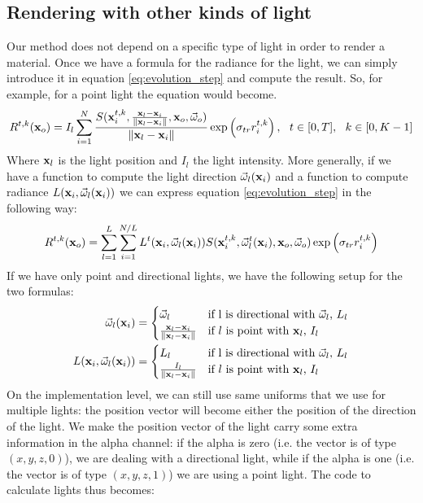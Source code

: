 \subsection{Rendering with other kinds of light}
Our method does not depend on a specific type of light in order to render a material. Once we have a formula for the radiance for the light, we can simply introduce it in equation \ref{eq:evolution_step} and compute the result. So, for example, for a point light the equation would become.
$$
R^{t,k}(\x_o) = {I_l} \sum_{i = 1}^N  \frac{S(\x^{t,k}_i, \frac{\x_l - \x_i}{\|\x_l - \x_i\|}, \x_o, \vomega_o)}{{\|\x_l - \x_i\|}} \exp\left(\sigma_{tr} r^{t,k}_i\right), \ \ t \in [0,T], \ \ k \in [0,K-1] 
\label{eq:evolution_step_2}
$$
Where $\mathbf{x}_l$ is the light position and $I_l$ the light intensity. More generally, if we have a function to compute the light direction $\vec{\omega}_l(\mathbf{x}_i)$ and a function to compute radiance $L(\mathbf{x}_i, \vec{\omega}_l(\mathbf{x}_i))$ we can express equation \ref{eq:evolution_step} in the following way:
$$
R^{t,k}(\mathbf{x}_o) = \sum_{l = 1}^L \sum_{i = 1}^{N/L} L^t(\mathbf{x}_i, \vec{\omega}_l(\mathbf{x}_i)) S(\mathbf{x}^{t,k}_i, \vec{\omega}_l^t(\mathbf{x}_i), \mathbf{x}_o, \vec{\omega}_o) \exp\left(\sigma_{tr} r^{t,k}_i\right)
$$
If we have only point and directional lights, we have the following setup for the two formulas:
\begin{equation*}
\begin{split}
\vec{\omega}_l(\mathbf{x}_i) &= \begin{cases}
\vec{\omega}_l & \text{if l is directional with $\vec{\omega}_l$, $L_l$} \\
 \frac{\mathbf{x}_l - \mathbf{x}_i}{\|\mathbf{x}_l - \mathbf{x}_i\|} & \text{if $l$ is point with $\mathbf{x}_l$, $I_l$}
\end{cases} \\
L(\mathbf{x}_i, \vec{\omega}_l(\mathbf{x}_i)) &= \begin{cases}
L_l & \text{if l is directional with $\vec{\omega}_l$, $L_l$} \\
 \frac{I_l}{\|\mathbf{x}_l - \mathbf{x}_i\|} & \text{if $l$ is point with $\mathbf{x}_l$, $I_l$}
\end{cases} \\
\end{split}
\end{equation*}
On the implementation level, we can still use same uniforms that we use for multiple lights: the position vector will become either the position of the direction of the light. We make the position vector of the light carry some extra information in the alpha channel: if the alpha is zero (i.e. the vector is of type $(x,y,z,0)$), we are dealing with a directional light, while if the alpha is one (i.e. the vector is of type $(x,y,z,1)$) we are using a point light. The code to calculate lights thus becomes:
